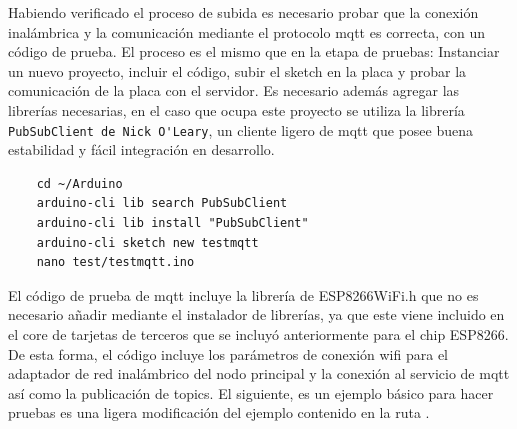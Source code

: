 \vspace{0.5cm}


Habiendo verificado el proceso de subida es necesario probar que la conexión inalámbrica y la comunicación mediante el protocolo \gls{mqtt} es correcta, con un código de prueba. El proceso es el mismo que en la etapa de pruebas: Instanciar un nuevo proyecto, incluir el código, subir el \gls{sketch} en la placa y probar la comunicación de la placa con el servidor. Es necesario además agregar las librerías necesarias, en el caso que ocupa este proyecto se utiliza la librería \verb|PubSubClient de Nick O'Leary|, un cliente ligero de \gls{mqtt} que posee buena estabilidad y fácil integración en desarrollo.

\begin{verbatim}
    cd ~/Arduino
    arduino-cli lib search PubSubClient
    arduino-cli lib install "PubSubClient"
    arduino-cli sketch new testmqtt
    nano test/testmqtt.ino
\end{verbatim}

El código de prueba de \gls{mqtt} incluye la librería de ESP8266WiFi.h que no es necesario añadir mediante el instalador de librerías, ya que este viene incluido en el core de tarjetas de terceros que se incluyó anteriormente para el chip ESP8266. De esta forma, el código incluye los parámetros de conexión \gls{wifi} para el adaptador de red inalámbrico del nodo principal y la conexión al servicio de \gls{mqtt} así como la publicación de topics. El siguiente, es un ejemplo básico para hacer pruebas es una ligera modificación del ejemplo contenido en la ruta .


